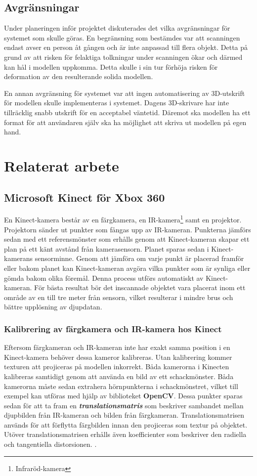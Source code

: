 \documentclass[a4paper,12pt,oneside,final]{extbook}
\begin{document}
\section{Avgränsningar}
Under planeringen inför projektet diskuterades det vilka avgränsningar för systemet som skulle göras. En begränsning som bestämdes var att scanningen endast avser en person åt gången och är inte anpassad till flera objekt. Detta på grund av att risken för felaktiga tolkningar under scanningen ökar och därmed kan hål i modellen uppkomma. Detta skulle i sin tur förhöja risken för deformation av den resulterande solida modellen.

En annan avgränsning för systemet var att ingen automatisering av 3D-utskrift för modellen skulle implementeras i systemet. Dagens 3D-skrivare har inte tillräcklig snabb utskrift för en acceptabel väntetid. Däremot ska modellen ha ett format för att användaren själv ska ha möjlighet att skriva ut modellen på egen hand.

\chapter{Relaterat arbete}

\section {Microsoft Kinect för Xbox 360}
\label{Kinect}
En Kinect-kamera består av en färgkamera, en IR-kamera\footnote{Infraröd-kamera} samt en projektor. Projektorn sänder ut punkter som fångas upp av IR-kameran. Punkterna jämförs sedan med ett referensmönster som erhålls genom att Kinect-kameran skapar ett plan på ett känt avstånd från kamerasensorn. Planet sparas sedan i Kinect-kamerans sensorminne. Genom att jämföra om varje punkt är placerad framför eller bakom planet kan Kinect-kameran avgöra vilka punkter som är synliga eller gömda bakom olika föremål. Denna process utförs automatiskt av Kinect-kameran. För bästa resultat bör det inscannade objektet vara placerat inom ett område av en till tre meter från sensorn, vilket resulterar i mindre brus och bättre upplösning av djupdatan\cite{Kinectsensor}.

\subsection{Kalibrering av färgkamera och IR-kamera hos Kinect}
Eftersom färgkameran och IR-kameran inte har exakt samma position i en Kinect-kamera behöver dessa kameror kalibreras. Utan kalibrering kommer texturen att projiceras på modellen inkorrekt\cite{Kinectsensor}. Båda kamerorna i Kinecten kalibreras samtidigt genom att använda en bild av ett schackmönster. Båda kamerorna måste sedan extrahera hörnpunkterna i schackmönstret, vilket till exempel kan utföras med hjälp av biblioteket \textbf{OpenCV}. Dessa punkter sparas sedan för att ta fram en \emph{\textbf{translationsmatris}} som beskriver sambandet mellan djupbilden från IR-kameran och bilden från färgkameran. Translationsmatrisen används för att förflytta färgbilden innan den projiceras som textur på objektet. Utöver translationsmatrisen erhålls även koefficienter som beskriver den radiella och tangentiella distorsionen. \cite{detphcomvis}.
\end{document}
